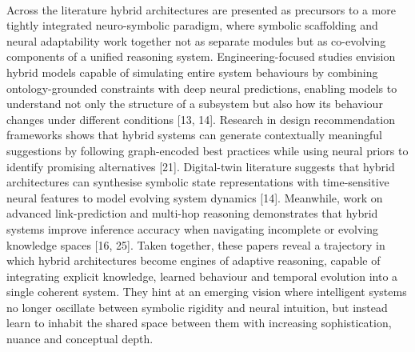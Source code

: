        \paragraph{} 
        Across the literature hybrid architectures are presented as precursors to a more tightly integrated neuro-symbolic paradigm, where symbolic scaffolding and neural adaptability work together not as separate modules but as co-evolving components of a unified reasoning system. Engineering-focused studies envision hybrid models capable of simulating entire system behaviours by combining ontology-grounded constraints with deep neural predictions, enabling models to understand not only the structure of a subsystem but also how its behaviour changes under different conditions [13, 14]. Research in design recommendation frameworks shows that hybrid systems can generate contextually meaningful suggestions by following graph-encoded best practices while using neural priors to identify promising alternatives [21]. Digital-twin literature suggests that hybrid architectures can synthesise symbolic state representations with time-sensitive neural features to model evolving system dynamics [14]. Meanwhile, work on advanced link-prediction and multi-hop reasoning demonstrates that hybrid systems improve inference accuracy when navigating incomplete or evolving knowledge spaces [16, 25]. Taken together, these papers reveal a trajectory in which hybrid architectures become engines of adaptive reasoning, capable of integrating explicit knowledge, learned behaviour and temporal evolution into a single coherent system. They hint at an emerging vision where intelligent systems no longer oscillate between symbolic rigidity and neural intuition, but instead learn to inhabit the shared space between them with increasing sophistication, nuance and conceptual depth.

        